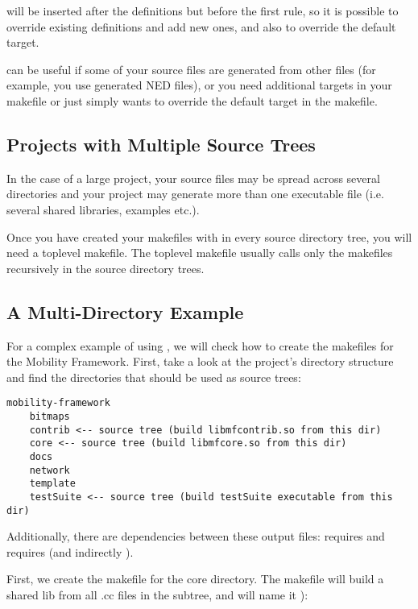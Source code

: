  will be inserted after the definitions but before the first
rule, so it is possible to override existing definitions and add new
ones, and also to override the default target.

 can be useful if some of your source files are generated
from other files (for example, you use generated NED files), or you need
additional targets in your makefile or just simply wants to override the
default target in the makefile.


\subsection{Projects with Multiple Source Trees}

In the case of a large project, your source files may be spread across
several directories and your project may generate more than one executable
file (i.e. several shared libraries, examples etc.).

Once you have created your makefiles with  in
every source directory tree, you will need a toplevel makefile.
The toplevel makefile usually calls only the makefiles
recursively in the source directory trees.


\subsection{A Multi-Directory Example}

For a complex example of using , we will check how to create
the makefiles for the Mobility Framework. First, take a look at the
project's directory structure and find the directories that should be used as
source trees:

\begin{verbatim}
mobility-framework
    bitmaps
    contrib <-- source tree (build libmfcontrib.so from this dir)
    core <-- source tree (build libmfcore.so from this dir)
    docs
    network
    template
    testSuite <-- source tree (build testSuite executable from this dir)
\end{verbatim}

Additionally, there are dependencies between these output files: 
requires  and  requires  (and indirectly
).

First, we create the makefile for the core directory. The makefile will build
a shared lib from all .cc files in the  subtree, and will name it ):

